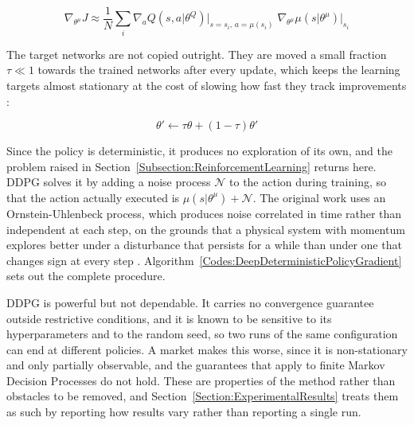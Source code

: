 \begin{equation}
\nabla_{\theta^{\mu}} J \approx \frac{1}{N} \sum_{i} \nabla_{a} Q(s, a | \theta^{Q}) \big|_{s = s_i,\, a = \mu(s_i)} \; \nabla_{\theta^{\mu}} \mu(s | \theta^{\mu}) \big|_{s_i}
\label{Equation:DeterministicPolicyGradient}
\end{equation}

The target networks are not copied outright. They are moved a small fraction \( \tau \ll 1 \) towards the trained networks after every update, which keeps the learning targets almost stationary at the cost of slowing how fast they track improvements \cite{lillicrap_continuous_2015}:

\begin{equation}
\theta' \leftarrow \tau \theta + (1 - \tau) \theta'
\label{Equation:SoftUpdate}
\end{equation}

Since the policy is deterministic, it produces no exploration of its own, and the problem raised in Section~\ref{Subsection:ReinforcementLearning} returns here. DDPG solves it by adding a noise process \( \mathcal{N} \) to the action during training, so that the action actually executed is \( \mu(s | \theta^{\mu}) + \mathcal{N} \). The original work uses an Ornstein-Uhlenbeck process, which produces noise correlated in time rather than independent at each step, on the grounds that a physical system with momentum explores better under a disturbance that persists for a while than under one that changes sign at every step \cite{lillicrap_continuous_2015}. Algorithm~\ref{Codes:DeepDeterministicPolicyGradient} sets out the complete procedure.



DDPG is powerful but not dependable. It carries no convergence guarantee outside restrictive conditions, and it is known to be sensitive to its hyperparameters and to the random seed, so two runs of the same configuration can end at different policies. A market makes this worse, since it is non-stationary and only partially observable, and the guarantees that apply to finite Markov Decision Processes do not hold. These are properties of the method rather than obstacles to be removed, and Section~\ref{Section:ExperimentalResults} treats them as such by reporting how results vary rather than reporting a single run.